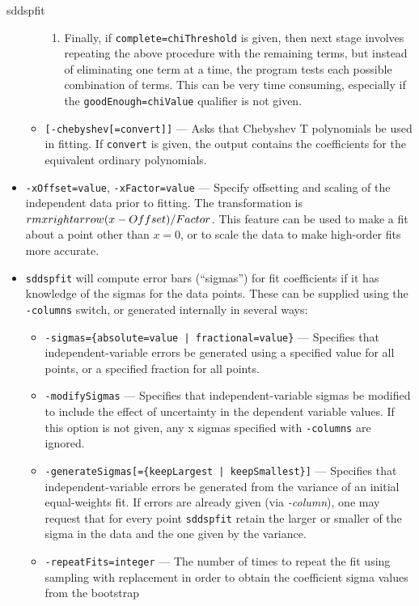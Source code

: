 \begin{sddsprog}{sddspfit}
\begin{itemize}
\begin{itemize}
\begin{enumerate}
              \item Finally, if \verb|complete=chiThreshold| is given, then next stage involves repeating the above procedure with the remaining terms, but instead of eliminating one term at a time, the program tests each possible combination of terms. This can be very time consuming, especially if the \verb|goodEnough=chiValue| qualifier is not given.
            \end{enumerate}
          \item \verb|[-chebyshev[=convert]]| --- Asks that Chebyshev T polynomials be used in fitting. If \verb|convert| is given, the output contains the coefficients for the equivalent ordinary polynomials.
        \end{itemize}
      \item \verb|-xOffset=value|, \verb|-xFactor=value| --- Specify offsetting and scaling of the independent data prior to fitting. The transformation is ${\\rm x \\rightarrow (x - Offset)/Factor}$. This feature can be used to make a fit about a point other than $x=0$, or to scale the data to make high-order fits more accurate.
      \item \verb|sddspfit| will compute error bars (``sigmas'') for fit coefficients if it has knowledge of the sigmas for the data points. These can be supplied using the \verb|-columns| switch, or generated internally in several ways:
        \begin{itemize}
          \item \verb!-sigmas={absolute=value | fractional=value}! --- Specifies that independent-variable errors be generated using a specified value for all points, or a specified fraction for all points.
          \item \verb|-modifySigmas| --- Specifies that independent-variable sigmas be modified to include the effect of uncertainty in the dependent variable values. If this option is not given, any x sigmas specified with \verb|-columns| are ignored.
          \item \verb!-generateSigmas[={keepLargest | keepSmallest}]! --- Specifies that independent-variable errors be generated from the variance of an initial equal-weights fit. If errors are already given (via \emph{-column}), one may request that for every point \verb|sddspfit| retain the larger or smaller of the sigma in the data and the one given by the variance.
          \item \verb|-repeatFits=integer| --- The number of times to repeat the fit using sampling with replacement in order to obtain the coefficient sigma values from the bootstrap

\end{itemize}
\end{itemize}
\end{sddsprog}
